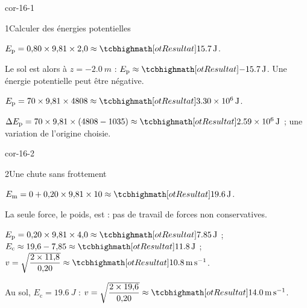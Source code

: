 \corrigesSouples

\begin{blocLivre}{cor-16-1}
\begin{corrige}{1}{Calculer des énergies potentielles}
\begin{questions}
\item $E_\mathrm{p}=0{,}80\times9{,}81\times2{,}0\approx\res{\qty{15,7}{J}}$.
\item Le sol est alors à $z=\qty{-2,0}{m}$ : $E_\mathrm{p}\approx\res{\qty{-15,7}{J}}$. Une énergie potentielle peut être négative.
\item $E_\mathrm{p}=70\times9{,}81\times4808\approx\res{\qty{3,30e6}{J}}$.
\item $\Delta E_\mathrm{p}=70\times9{,}81\times(4808-1035)\approx\res{\qty{2,59e6}{J}}$ ; une variation  de l'origine choisie.
\end{questions}
\end{corrige}
\end{blocLivre}
\begin{blocLivre}{cor-16-2}
\begin{corrige}{2}{Une chute sans frottement}
\begin{questions}
\item $E_\mathrm{m}=0+0{,}20\times9{,}81\times10\approx\res{\qty{19,6}{J}}$.
\item La seule force, le poids, est  : pas de travail de forces non conservatives.
\item $E_\mathrm{p}=0{,}20\times9{,}81\times4{,}0\approx\res{\qty{7,85}{J}}$ ; $E_\mathrm{c}\approx19{,}6-7{,}85\approx\res{\qty{11,8}{J}}$ ; $v=\sqrt{\dfrac{2\times11{,}8}{0{,}20}}\approx\res{\qty{10,8}{m.s^{-1}}}$.
\item Au sol, $E_\mathrm{c}=\qty{19,6}{J}$ : $v=\sqrt{\dfrac{2\times19{,}6}{0{,}20}}\approx\res{\qty{14,0}{m.s^{-1}}}$.
\end{questions}
\end{corrige}
\end{blocLivre}
